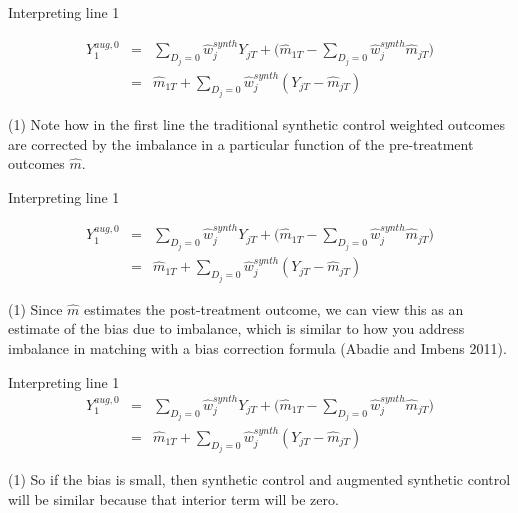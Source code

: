 \documentclass{beamer}
\begin{document}
\begin{frame}{Interpreting line 1}

\begin{eqnarray*}
Y_1^{aug,0} &=& \sum_{D_j=0} \widehat{w}_j^{synth} Y_{jT} + \bigg (\widehat{m}_{1T} - \sum_{D_j=0} \widehat{w}_j^{synth}\widehat{m}_{jT} \bigg ) \\
&=& \widehat{m}_{1T} + \sum_{D_j=0} \widehat{w}_j^{synth} (Y_{jT} - \widehat{m}_{jT})
\end{eqnarray*}

(1) Note how in the first line the traditional synthetic control weighted outcomes are corrected by the imbalance in a particular function of the pre-treatment outcomes $\widehat{m}$. 
\end{frame}




\begin{frame}{Interpreting line 1}

\begin{eqnarray*}
Y_1^{aug,0}  &=& \sum_{D_j=0} \widehat{w}_j^{synth} Y_{jT} + \bigg (\widehat{m}_{1T} - \sum_{D_j=0} \widehat{w}_j^{synth}\widehat{m}_{jT} \bigg ) \\
&=& \widehat{m}_{1T} + \sum_{D_j=0} \widehat{w}_j^{synth} (Y_{jT} - \widehat{m}_{jT})
\end{eqnarray*}

(1) Since $\widehat{m}$ estimates the post-treatment outcome, we can view this as an estimate of the bias due to imbalance, which is similar to how you address imbalance in matching with a bias correction formula (Abadie and Imbens 2011). 

\end{frame}





\begin{frame}{Interpreting line 1}
\begin{eqnarray*}
Y_1^{aug,0}  &=& \sum_{D_j=0} \widehat{w}_j^{synth} Y_{jT} + \bigg (\widehat{m}_{1T} - \sum_{D_j=0} \widehat{w}_j^{synth}\widehat{m}_{jT} \bigg ) \\
&=& \widehat{m}_{1T} + \sum_{D_j=0} \widehat{w}_j^{synth} (Y_{jT} - \widehat{m}_{jT})
\end{eqnarray*}

(1) So if the bias is small, then synthetic control and augmented synthetic control will be similar because that interior term will be zero.

\end{frame}
\end{document}

